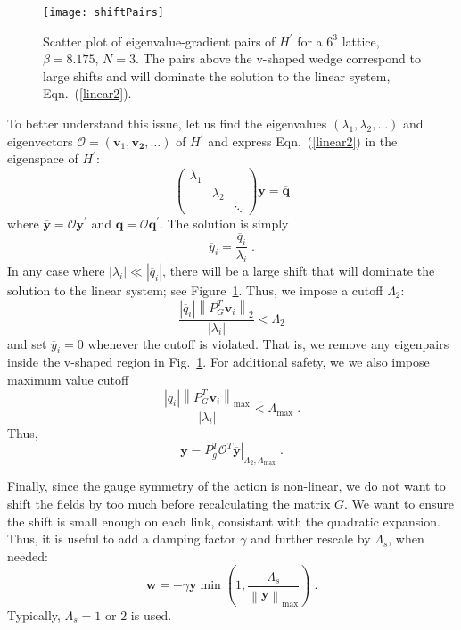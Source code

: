 \documentclass[preprint,aps,prd]{revtex4-2}
\newcommand{\be}{\begin{equation}}
\newcommand{\eq}{\end{equation}}
\begin{document}
\begin{figure}
\texttt{[image: shiftPairs]}
\caption{Scatter plot of eigenvalue-gradient pairs of $H^\prime$
  for a $6^3$ lattice, $\beta = 8.175$, $N=3$.  The pairs above the
  v-shaped wedge correspond to large shifts and will dominate
  the solution to the linear system, Eqn.~(\ref{linear2}).
  \label{shiftPairs}}
\end{figure}

To better understand this issue, let us find the eigenvalues
$\left(\lambda_1, \lambda_2, \ldots\right)$ and
eigenvectors $\mathcal{O}=\left(\mathbf{v}_1, \mathbf{v_2}, \ldots\right)$
of $H^\prime$ and express Eqn.~(\ref{linear2}) in the eigenspace of $H^\prime$:
\be
\begin{pmatrix}
    \lambda_1 & & \\
    & \lambda_2 & \\
    & & \ddots  \end{pmatrix} \overline{\mathbf{y}} =
  \overline{\mathbf{q}} \label{linear3}
\eq
where $\overline{\mathbf{y}} = \mathcal{O} \mathbf{y}^\prime$ and
$\overline{\mathbf{q}}  = \mathcal{O} \mathbf{q}^\prime$.
The solution is simply
\be
    \overline{y}_i = \frac{\overline{q}_i}{\lambda_i} \; .
\eq
In any case where $\left|\lambda_i\right|\ll
\left|\overline{q}_i\right|$,
there will be a large shift that will dominate the solution
to the linear system; see Figure~\ref{shiftPairs}.
Thus, we impose a cutoff $\Lambda_2$:
\be
    \frac{\left|\overline{q}_i\right|\left\lVert P_G^T \mathbf{v}_i\right\rVert_2}{\left|\lambda_i\right|}
     < \Lambda_2 \label{lambda2}
\eq
%
and set $\overline{y}_i=0$ whenever the cutoff is violated.
That is, we remove any eigenpairs inside the v-shaped
region in Fig.~\ref{shiftPairs}.  For additional safety, we
we also impose maximum value cutoff
\be
    \frac{\left|\overline{q}_i\right|
      \left\lVert P_G^T \mathbf{v}_i\right\rVert_\mathrm{max}}
    {\left|\lambda_i\right|}
    < \Lambda_\mathrm{max} \; .
\eq
Thus,
\be
      \mathbf{y} = P_g^T \left. \mathcal{O}^T
                    \overline{\mathbf{y}}\right|_{\Lambda_2,\Lambda_\mathrm{max}} \; .
\eq

Finally, since the gauge symmetry of the action is non-linear,
we do not want to shift the fields by too much before recalculating
the matrix $G$.  We want to ensure the shift is small
enough on each link, consistant with the quadratic expansion.
Thus, it is useful to add a damping factor $\gamma$ and
further rescale by $\Lambda_s$, when needed:
\be
    \mathbf{w} = - \gamma \mathbf{y} \min\left(1, \frac{\Lambda_s}{\left\lVert \mathbf{y}\right\rVert_\mathrm{max}}\right) \; .
\eq
Typically, $\Lambda_s = 1$ or $2$ is used.
\end{document}
